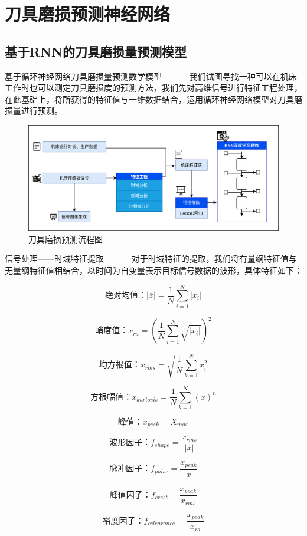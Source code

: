 \section{刀具磨损预测神经网络}
% 
% 
\subsection{基于RNN的刀具磨损量预测模型}
\begin{frame}{基于循环神经网络刀具磨损量预测数学模型}
\ \ \ \ \ \ 我们试图寻找一种可以在机床工作时也可以测定刀具磨损度的预测方法，我们先对高维信号进行特征工程处理，在此基础上，将所获得的特征值与一维数据结合，运用循环神经网络模型对刀具磨损量进行预测。\par
% 
% 
\begin{figure}[htp]
    \centering
    \includegraphics[width=12cm]{刀具磨损量预测神经网络/RNN测定模型.png}
    \caption{刀具磨损预测流程图}
\end{figure}
% 
% 
\end{frame} 
% 
% 
\begin{frame}{信号处理——时域特征提取}
\ \ \ \ \ \ 对于时域特征的提取，我们将有量纲特征值与无量纲特征值相结合，以时间为自变量表示目标信号数据的波形，具体特征如下：
\begin{minipage}[t]{0.45\textwidth}
\centering
$$ 绝对均值： |\bar{x}|=\frac{1}{N} \sum_{i=1}^{N}\left|x_{i}\right| $$\par
$$ 峭度值：x_{ra}=\left(\frac{1}{N} \sum_{i=1}^{N} \sqrt{|x_i|}\right)^{2} $$\par
$$ 均方根值：x_{rms}=\sqrt{\frac{1}{N} \sum_{k=1}^{N} x_{i}^{2}} $$\par
$$ 方根幅值：x_{kurtosis}=\frac{1}{N} \sum_{k=1}^{N}(x)^{n} $$\par
\end{minipage}
\begin{minipage}[t]{0.45\textwidth}
\centering
$$ 峰值：x_{pesk}=X_{max} $$\par
$$ 波形因子：f_{shape}=\frac{x_{rms}}{|\bar{x}|} $$\par
$$ 脉冲因子：f_{pulse}=\frac{x_{peak}}{|x|} $$\par
$$ 峰值因子：f_{crest}=\frac{x_{peak}}{x_{rms}} $$\par
$$ 裕度因子：f_{celearance}=\frac{x_{peak}}{x_{ra}} $$\par
\end{minipage}
\end{frame} 
